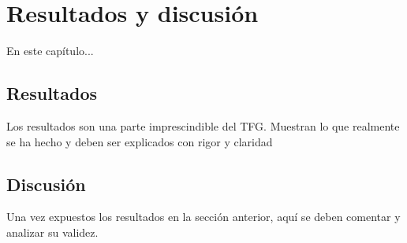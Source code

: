 \chapter{Resultados y discusión}

En este capítulo...


\section{Resultados}

Los resultados son una parte imprescindible del TFG. Muestran lo que realmente se ha hecho y deben ser explicados con rigor y claridad

\section{Discusión}

Una vez expuestos los resultados en la sección anterior, aquí se deben comentar y analizar su validez.